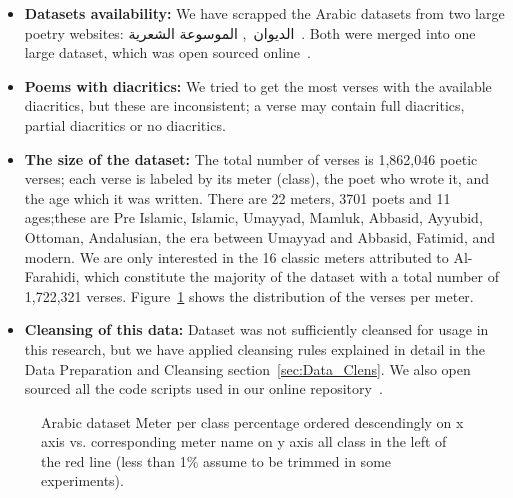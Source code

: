 \begin{itemize}

 \item \textbf{Datasets availability:} We have scrapped the Arabic datasets from two large poetry websites: \textarabic{الديوان}~\cite{diwan}, \textarabic{الموسوعة الشعرية}~\cite{PoetryEncyclopedia2016}. Both were merged into one large dataset, which was open sourced online~\cite{ArabicpoetryDS}.

 \item \textbf{Poems with diacritics:} We tried to get the most verses with the available diacritics, but these are inconsistent; a verse may contain full diacritics, partial diacritics or no diacritics.

 \item \textbf{The size of the dataset:} The total number of verses is 1,862,046 poetic verses; each verse is labeled by its meter (class), the poet who wrote it, and the age which it was written. There are 22 meters, 3701 poets and 11 ages;these are Pre Islamic, Islamic, Umayyad, Mamluk, Abbasid, Ayyubid, Ottoman, Andalusian, the era between Umayyad and Abbasid, Fatimid, and modern. We are only interested in the 16 classic meters attributed to Al-Farahidi, which constitute the majority of the dataset with a total number of 1,722,321 verses. Figure~\ref{Fig:Data_Size_Distribution} shows the distribution of the verses per meter. %
 
 \item \textbf{Cleansing of this data:} Dataset was not sufficiently cleansed for usage in this research, but we have applied cleansing rules explained in detail in the Data Preparation and Cleansing section~\ref{sec:Data_Clens}. We also open sourced all the code scripts used in our online repository~\cite{HCILAB_ArabicPoetry_2018}.
\end{itemize}

\begin{figure}[!t]
 \centering
 \begin{tikzpicture}
  
 \end{tikzpicture}%
 \caption{Arabic dataset Meter per class percentage ordered descendingly on x axis vs. corresponding meter name on y axis all class in the left of the red line (less than 1\% assume to be trimmed in some experiments).	}\label{Fig:Data_Size_Distribution}
\end{figure}

